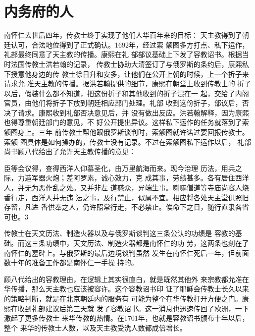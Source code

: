 \section{内务府的人}
\par
南怀仁去世后四年，传教士终于实现了他们人华百年来的目标：%
天主教得到了朝廷认可，合法地位得到了正式确认。1692年，经过索%
额图多方打点、私下运作，礼部最终同意了天主教的传播。康熙在礼%
部部议基础上下发了容教诏书。根据当时法国传教士洪若翰的记录，%
传教士协助大清签订了与俄罗斯的条约后，康熙私下授意他身边的传%
教士徐日升和安多，让他们在公开上朝的时候，上一个折子来请求允%
准天主教的传播。据洪若翰提供的细节，康熙在朝堂上收到传教士的%
折子以后，假装什么都不知道，把这份折子和其他收到的折子混在一%
起，交给了内阁官员，由他们将折子下放到朝廷相应部门处理。礼部%
收到这份折子，部议后，否决了请求。康熙收到礼部否决意见后，并%
没有做出反应。洪若翰解释，因为康熙也得尊重朝廷部门的意见，不%
好公开提出异议。这样私下运作的任务就落到了索额图身上。三年%
前传教士帮他跟俄罗斯谈判时，索额图就许诺过要回报传教士。索额%
图具体是如何操办的，传教士没有记录。不过在索额图私下运作以后，%
礼部尚书顾八代给出了允许天主教传播的意见：%
\par
{\bookkai 臣等会议得，查得西洋人仰慕圣化，由万里航海而来。现今治理}%
{\bookkai 历法，用兵之际，力造军器火炮；差阿罗素，诚心效力，克}%
{\bookkai 成其事，劳绩甚多。各有居住西洋人，并无为恶作乱之处。又并非左}%
{\bookkai 道惑众，异端生事。喇嘛僧道等寺庙尚容人烧香行走，西洋人并无违}%
{\bookkai 法之事，及行禁止，似属不宜。相应将各处天主堂俱照旧存留，凡进}%
{\bookkai 香供奉之人，仍许照常行走，不必禁止。俟命下之日，随行直隶各省}%
{\bookkai 可也。3}%
\par
传教士在天文历法、制造火器以及与俄罗斯谈判这三条公认的功绩是%
容教的基础。而这三条功绩中，天文历法、制造火器都是南怀仁的功%
劳，这两条也刻在了南怀仁的墓碑上。与俄罗斯的最后边境谈判虽然%
发生在南怀仁死后一年，但前面数十年的准备工作都是南怀仁一手操%
持的。%
\par
顾八代给出的容教理由，在逻辑上其实很直白，就是既然其他外%
来宗教都允准在华传播，那么天主教也应该被容许。这个容教诏书印%
证了耶稣会传教士长久以来的策略判断，就是在北京朝廷内的服务有%
可能为整个在华传教打开方便之门。康熙在收到礼部建议后第三天就%
发了容教诏书。这一消息也迅速传回了欧洲，一下激起了更多传教士%
来华传教的热情。在1701年，也就是容教诏书颁布十年以后，整个%
来华的传教士人数，以及天主教受洗人数都成倍增长。%
